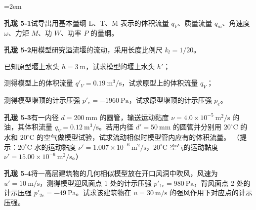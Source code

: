 \begin{ti}\sloppy\emergencystretch=2em

\item \textbf{孔珑 5-1}\quad 试导出用基本量纲 L、T、M 表示的体积流量 $q_V$、质量流量 $q_m$、角速度 $\omega$、力矩 $M$、功 $W$、功率 $P$ 的量纲。

\item \textbf{孔珑 5-2}\quad 用模型研究溢流堰的流动，采用长度比例尺 $k_l=1/20$。
\begin{xiaowen}
\item 已知原型堰上水头 $h=3\ \mathrm{m}$，试求模型的堰上水头 $h'$；
\item 测得模型上的体积流量 $q'_V=0.19\ \mathrm{m^3/s}$，试求原型上的体积流量 $q_V$；
\item 测得模型堰顶的计示压强 $p'_e=-1960\ \mathrm{Pa}$，试求原型堰顶的计示压强 $p_e$。
\end{xiaowen}

\item \textbf{孔珑 5-3}\quad 有一内径 $d=200\ \mathrm{mm}$ 的圆管，输送运动黏度 $\nu=4.0\times10^{-5}\ \mathrm{m^2/s}$ 的油，其体积流量 $q_V=0.12\ \mathrm{m^3/s}$。若用内径 $d'=50\ \mathrm{mm}$ 的圆管并分别用 $20^{\circ}\mathrm{C}$ 的水和 $20^{\circ}\mathrm{C}$ 的空气做模型试验，试求流动相似时模型管内应有的体积流量。
（提示：$20^{\circ}\mathrm{C}$ 水的运动黏度 $\nu'=1.007\times10^{-6}\ \mathrm{m^2/s}$，$20^{\circ}\mathrm{C}$ 空气的运动黏度 $\nu'=15.00\times10^{-6}\ \mathrm{m^2/s}$。）

\item \textbf{孔珑 5-4}\quad 将一高层建筑物的几何相似模型放在开口风洞中吹风，风速为 $u'=10\ \mathrm{m/s}$，测得模型迎风面点 1 处的计示压强 $p'_{1e}=980\ \mathrm{Pa}$，背风面点 2 处的计示压强 $p'_{2e}=-49\ \mathrm{Pa}$。试求该建筑物在 $u=30\ \mathrm{m/s}$ 的强风作用下对应点的计示压强。


\end{ti}

